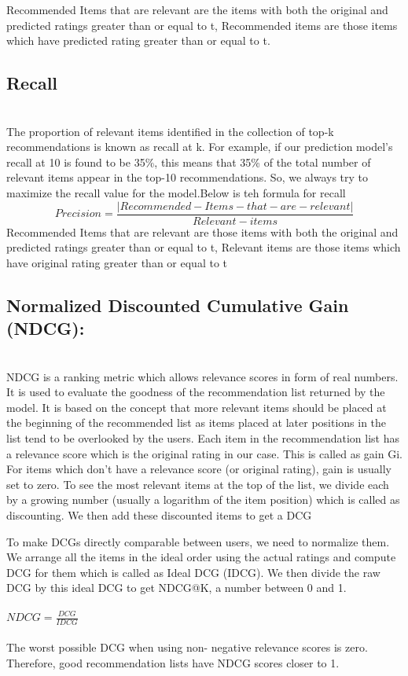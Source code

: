 \documentclass[sigconf]{acmart}
\begin{document}
Recommended Items that are relevant are the items
with both the original and predicted ratings greater
than or equal to t,
Recommended items are those items which have
predicted rating greater than or equal to t.\\

\subsection{Recall}\\
The proportion of relevant items identified in the collection of top-k recommendations is known as recall at k.
For example, if our prediction model's recall at 10 is found to be 35\%, this means that 35\% of the total number of relevant items appear in the top-10 recommendations.
So, we always try to maximize the recall value for the model.Below is teh formula for recall\\
$$
Precision = \frac{|Recommended-Items-that-are-relevant|}{Relevant-items }
$$
Recommended Items that are relevant are those items
with both the original and predicted ratings greater
than or equal to t,
Relevant items are those items which have original
rating greater than or equal to t\\

\subsection{Normalized Discounted Cumulative Gain (NDCG):}\\
NDCG is a ranking metric which allows relevance
scores in form of real numbers. It is used to evaluate
the goodness of the recommendation list returned
by the model. It is based on the concept that more
relevant items should be placed at the beginning of the
recommended list as items placed at later positions
in the list tend to be overlooked by the users. Each
item in the recommendation list has a relevance score
which is the original rating in our case. This is called
as gain Gi. For items which don’t have a relevance
score (or original rating), gain is usually set to zero.
To see the most relevant items at the top of the list, we
divide each by a growing number (usually a logarithm
of the item position) which is called as discounting.
We then add these discounted items to get a DCG

To make DCGs directly comparable between users,
we need to normalize them. We arrange all the items
in the ideal order using the actual ratings and compute
DCG for them which is called as Ideal DCG (IDCG).
We then divide the raw DCG by this ideal DCG to
get NDCG@K, a number between 0 and 1.\\\\
$NDCG = \frac{DCG}{IDCG}$\\\\
The worst possible DCG when using non-
negative relevance scores is zero. Therefore, good
recommendation lists have NDCG scores closer to 1.
\end{document}
